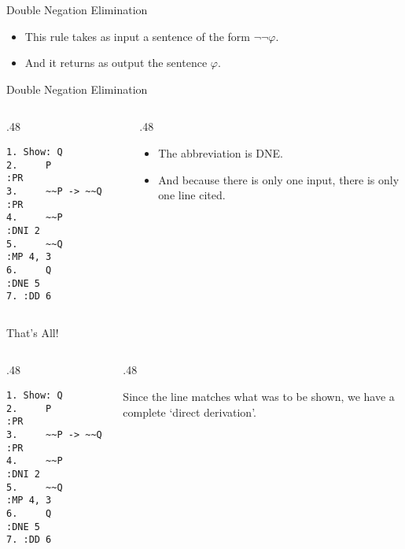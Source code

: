 \documentclass[
  ignorenonframetext,
]{beamer}
\providecommand{\tightlist}{%
  \setlength{\itemsep}{0pt}\setlength{\parskip}{0pt}}
\renewcommand{\,}{\text{, }}
\def\begincols{\begin{columns}}
\def\begincol{\begin{column}}
\def\endcol{\end{column}}
\def\endcols{\end{columns}}
\begin{document}
\begin{frame}{Double Negation Elimination}
\protect\hypertarget{double-negation-elimination}{}

\begin{itemize}
\tightlist
\item
  This rule takes as input a sentence of the form \(\neg \neg \varphi\).
\item
  And it returns as output the sentence \(\varphi\).
\end{itemize}

\end{frame}

\begin{frame}[fragile]{Double Negation Elimination}
\protect\hypertarget{double-negation-elimination-1}{}

\begincols
\begincol{.48\textwidth}

\begin{verbatim}
1. Show: Q
2.     P          :PR
3.     ~~P -> ~~Q :PR
4.     ~~P        :DNI 2
5.     ~~Q        :MP 4, 3
6.     Q          :DNE 5
7. :DD 6
\end{verbatim}

\endcol
\begincol{.48\textwidth}

\begin{itemize}
\tightlist
\item
  The abbreviation is DNE.
\item
  And because there is only one input, there is only one line cited.
\end{itemize}

\endcol
\endcols

\end{frame}

\begin{frame}[fragile]{That's All!}
\protect\hypertarget{thats-all}{}

\begincols
\begincol{.48\textwidth}

\begin{verbatim}
1. Show: Q
2.     P          :PR
3.     ~~P -> ~~Q :PR
4.     ~~P        :DNI 2
5.     ~~Q        :MP 4, 3
6.     Q          :DNE 5
7. :DD 6
\end{verbatim}

\endcol
\begincol{.48\textwidth}

Since the line matches what was to be shown, we have a complete `direct
derivation'.

\endcol
\endcols

\end{frame}
\end{document}
